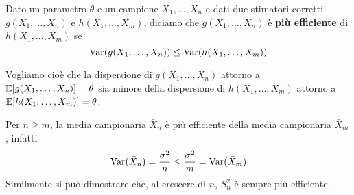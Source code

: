 \begin{definition}\label{def: stimatore efficiente}
	Dato un parametro $\theta$ e un campione $X_1, \dots, X_n$ e dati due stimatori corretti
	$g(X_1, \dots, X_n)$ e $h(X_1, \dots, X_m)$, diciamo che $g(X_1, \dots, X_n)$ è
	\textbf{più efficiente} di $h(X_1, \dots, X_m)$ se
	\[ \operatorname{Var}(g(X_1, \dots, X_n)) \leq \operatorname{Var}(h(X_1, \dots, X_m)) \]
\end{definition}

Vogliamo cioè che la dispersione di $g(X_1, \dots, X_n)$ attorno a
$\mathbb{E}[g(X_1, \dots, X_n)] = \theta$ sia minore della dispersione di $h(X_1, \dots, X_m)$ attorno a
$\mathbb{E}[h(X_1, \dots, X_m)] = \theta$.

Per $n \geq m$, la media campionaria $\bar{X}_n$ è più efficiente della media campionaria
$\bar{X}_m$, infatti
\[ \operatorname{Var}(\bar{X}_n) = \frac{\sigma^2}{n} \leq \frac{\sigma^2}{m} = \operatorname{Var}(\bar{X}_m) \]
Similmente si può dimostrare che, al crescere di $n$, $S_n^2$ è sempre più efficiente.